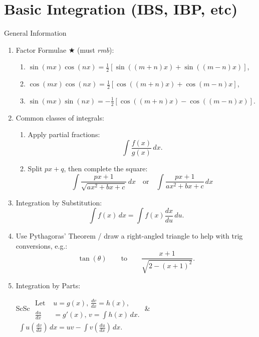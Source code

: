 \documentclass[oneside]{book}
\begin{document}
\section{Basic Integration (IBS, IBP, etc)}
\begin{stbox}{General Information}
  \begin{enumerate}
    \item Factor Formulae \(\bigstar\) (must \emph{rmb}):
    \begin{enumerate}
      \item \(\sin(mx)\cos(nx)=\frac{1}{2}[\sin((m+n)x)+\sin((m-n)x)]\),
      \item \(\cos(mx)\cos(nx)=\frac{1}{2}[\cos((m+n)x)+\cos(m-n)x]\),
      \item \(\sin(mx)\sin(nx)=-\frac{1}{2}[\cos((m+n)x)-\cos((m-n)x)]\).
    \end{enumerate}
    \item Common classes of integrals:
    \begin{enumerate}
      \item Apply partial fractions:
      \[\int\frac{f(x)}{g(x)}\,dx.\]
      \item Split \(px+q\), then complete the square:
      \[\int \frac{px+1}{\sqrt{ax^2+bx+c}}\,dx \quad\text{or}\quad \int \frac{px+1}{ax^2+bx+c}\,dx\] 
    \end{enumerate}
    \item Integration by Substitution: 
    \[\int f(x) \, dx=\int f(x)\frac{dx}{du}\,du.\]
    \item Use Pythagoras' Theorem / draw a right-angled triangle to help with trig conversions, e.g.:
    \[\tan(\theta) \qquad\text{to}\qquad \frac{x+1}{\sqrt{2-(x+1)^2}}.\]
    \item Integration by Parts:
    \begin{center}
      \begin{tabular}{ScSc}
        \(\begin{aligned}
          \text{Let }&u=g(x)\text{, }\frac{dv}{dx}=h(x),\\
          \frac{du}{dx}&=g'(x)\text{, }v=\int h(x)\, dx.
        \end{aligned}\) & \hspace{1cm}\(\begin{aligned}
          \int u\left(\frac{dv}{dx}\right)\,dx=uv-\int v \left(\frac{du}{dx}\right)\,dx.
        \end{aligned}\)
      \end{tabular}
    \end{center}
  \end{enumerate}
\end{stbox}
\newpage
\end{document}
